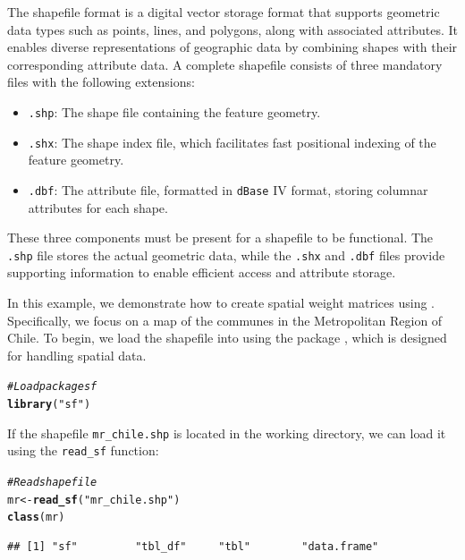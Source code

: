 \documentclass[english,12pt]{book}\usepackage[]{graphicx}\usepackage[]{xcolor}
\makeatletter
\newcommand{\hlsng}[1]{\textcolor[rgb]{0.192,0.494,0.8}{#1}}%
\newcommand{\hlcom}[1]{\textcolor[rgb]{0.678,0.584,0.686}{\textit{#1}}}%
\newcommand{\hldef}[1]{\textcolor[rgb]{0.345,0.345,0.345}{#1}}%
\newcommand{\hlkwb}[1]{\textcolor[rgb]{0.69,0.353,0.396}{#1}}%
\newcommand{\hlkwd}[1]{\textcolor[rgb]{0.737,0.353,0.396}{\textbf{#1}}}%
\newenvironment{kframe}{%
 \def\at@end@of@kframe{}%
 \ifinner\ifhmode%
  \def\at@end@of@kframe{\end{minipage}}%
  \begin{minipage}{\columnwidth}%
 \fi\fi%
 \def\FrameCommand##1{\hskip\@totalleftmargin \hskip-\fboxsep
 \colorbox{shadecolor}{##1}\hskip-\fboxsep
     \hskip-\linewidth \hskip-\@totalleftmargin \hskip\columnwidth}%
 \MakeFramed {\advance\hsize-\width
   \@totalleftmargin\z@ \linewidth\hsize
   \@setminipage}}%
 {\par\unskip\endMakeFramed%
 \at@end@of@kframe}
\newenvironment{knitrout}{}{} %
\makeatother
\begin{document}
The shapefile format is a digital vector storage format that supports geometric data types such as points, lines, and polygons, along with associated attributes. It enables diverse representations of geographic data by combining shapes with their corresponding attribute data. A complete shapefile consists of three mandatory files with the following extensions:
\begin{itemize}
  \item \texttt{.shp}: The shape file containing the feature geometry.
  \item \texttt{.shx}: The shape index file, which facilitates fast positional indexing of the feature geometry.
  \item \texttt{.dbf}: The attribute file, formatted in \texttt{dBase} IV format, storing columnar attributes for each shape.
\end{itemize}

These three components must be present for a shapefile to be functional. The \texttt{.shp} file stores the actual geometric data, while the \texttt{.shx} and \texttt{.dbf} files provide supporting information to enable efficient access and attribute storage.

In this example, we demonstrate how to create spatial weight matrices using . Specifically, we focus on a map of the communes in the Metropolitan Region of Chile. To begin, we load the shapefile into  using the  package \citep{pabesmasf}, which is designed for handling spatial data.

\begin{knitrout}
\color{fgcolor}\begin{kframe}
\begin{alltt}
\hlcom{#Load package sf}
\hlkwd{library}\hldef{(}\hlsng{"sf"}\hldef{)}
\end{alltt}
\end{kframe}
\end{knitrout}

If the shapefile \texttt{mr\_chile.shp} is located in the working directory, we can load it using the \texttt{read\_sf} function:
\begin{knitrout}
\color{fgcolor}\begin{kframe}
\begin{alltt}
\hlcom{# Read shape file}
\hldef{mr} \hlkwb{<-} \hlkwd{read_sf}\hldef{(}\hlsng{"mr_chile.shp"}\hldef{)}
\hlkwd{class}\hldef{(mr)}
\end{alltt}
\begin{verbatim}
## [1] "sf"         "tbl_df"     "tbl"        "data.frame"
\end{verbatim}
\end{kframe}
\end{knitrout}
\end{document}
